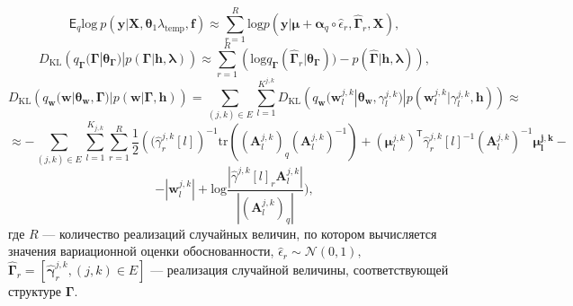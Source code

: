 \[
   \mathsf{E}_q \text{log}~p(\mathbf{y}|\mathbf{X}, \boldsymbol{\theta}_1 \lambda_{\text{temp}}, \mathbf{f}) \approx   \sum_{r=1}^R \text{log}p(\mathbf{y}|\boldsymbol{\mu}+\boldsymbol{\alpha}_q \circ \hat{\epsilon}_r, \hat{\boldsymbol{\Gamma}}_r, \mathbf{X}),
\]
\[
D_\text{KL}\left(q_{\boldsymbol{\Gamma}}(\boldsymbol{\Gamma}|\boldsymbol{\theta}_{\boldsymbol{\Gamma}})|p(\boldsymbol{\Gamma}|\mathbf{h}, \boldsymbol{\lambda})\right)   \approx  \sum_{r=1}^R \left(\text{log}q_{\boldsymbol{\Gamma}}(\hat{\boldsymbol{\Gamma}}_r|\boldsymbol{\theta}_{\boldsymbol{\Gamma}}))-p(\hat{\boldsymbol{\Gamma}}|\mathbf{h},\boldsymbol{\lambda})\right),
\]
\[
D_\text{KL}\left(q_{\mathbf{w}}(\mathbf{w}|\boldsymbol{\theta}_\mathbf{w},\boldsymbol{\Gamma})|p(\mathbf{w}|\boldsymbol{\Gamma}, \mathbf{h})\right)  =  \sum_{(j,k) \in E}\sum_{l=1}^{K^{j,k}} D_\text{KL}\left(q_{\mathbf{w}}(\mathbf{w}^{j,k}_l|\boldsymbol{\theta}_\mathbf{w},\gamma^{j,k}_l)|p(\mathbf{w}^{j,k}_l|\gamma^{j,k}_l, \mathbf{h})\right)\approx
\]
\[ 
\approx-\sum_{(j,k) \in E}\sum_{l=1}^{K_{j,k}}\sum_{r=1}^R\frac{1}{2}\left( (\hat{\gamma}^{j,k}_r[l]\right)^{-1}\text{tr}((\mathbf{A}^{j,k}_l)_q(\mathbf{A}^{j,k}_l)^{-1})+(\boldsymbol{\mu}^{j,k}_l)^{\mathsf{T}}\hat{\gamma}^{j,k}_r[l]^{-1}(\mathbf{A}^{j,k}_l)^{-1}\boldsymbol{\mu^{j,k}_l} -
\]
\[
- |\mathbf{w}^{j,k}_l|+\text{log}\frac{|\hat{\gamma}^{j,k}[l]_r\mathbf{A}^{j,k}_l|}{|(\mathbf{A}^{j,k}_l)_q|}),
\]
где $R$ --- количество реализаций случайных величин, по котором вычисляется значения вариационной оценки обоснованности, $\hat{\epsilon}_r \sim \mathcal{N}(0,1),$
 $\hat{\boldsymbol{\Gamma}}_r = [\hat{\boldsymbol{\gamma}}^{j,k}_r, (j,k) \in E]$ --- реализация случайной величины, соответствующей структуре $\boldsymbol{\Gamma}$.


